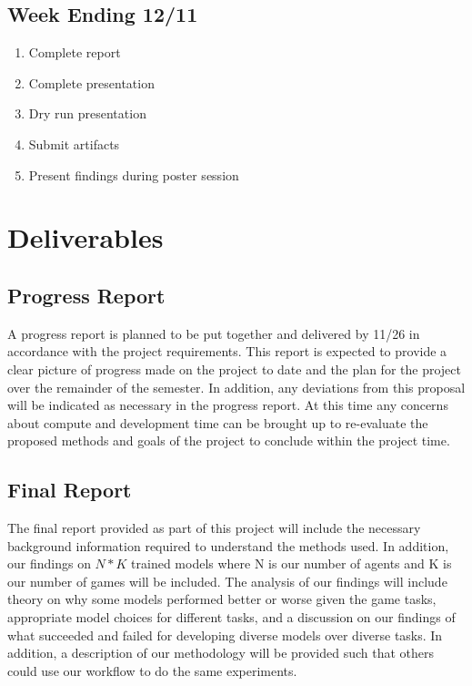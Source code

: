 \documentclass[conference]{IEEEtran}
\begin{document}
\subsection{Week Ending 12/11}
\begin{enumerate}
    \item Complete report
    \item Complete presentation
    \item Dry run presentation
    \item Submit artifacts
    \item Present findings during poster session
\end{enumerate}

\section{Deliverables}

\subsection{Progress Report}
A progress report is planned to be put together and delivered by 11/26 in accordance with the project requirements.
This report is expected to provide a clear picture of progress made on the project to date and the plan for the project over the remainder of the semester.
In addition, any deviations from this proposal will be indicated as necessary in the progress report. At this time any concerns about compute and development time can be brought up to re-evaluate the proposed methods and goals of the project to conclude within the project time.

\subsection{Final Report}
The final report provided as part of this project will include the necessary background information required to understand the methods used.
In addition, our findings on $N*K$ trained models where N is our number of agents and K is our number of games will be included.
The analysis of our findings will include theory on why some models performed better or worse given the game tasks, appropriate model choices for different tasks, and a discussion on our findings of what succeeded and failed for developing diverse models over diverse tasks.
In addition, a description of our methodology will be provided such that others could use our workflow to do the same experiments.
\end{document}
